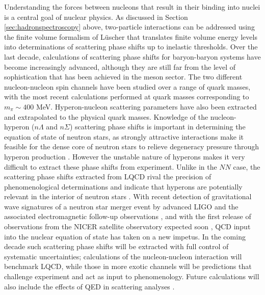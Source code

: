 Understanding the  forces between nucleons that result in their binding into nuclei is a central goal of nuclear physics. As discussed in Section \ref{sec:hadronspectroscopy} above, two-particle interactions can be addressed using the finite volume formalism of L\"uscher \cite{Luscher:1986pf,Luscher:1990ck} that translates finite volume energy levels into determinations of scattering phase shifts up to inelastic thresholds. Over the last decade, calculations of scattering phase shifts for baryon-baryon systems have become increasingly advanced, although they are still far from the level of sophistication that has been achieved in the meson sector. The two different nucleon-nucleon spin channels have been studied over a range of quark masses, with the most recent calculations  performed at quark masses corresponding to $m_\pi\sim 400$ MeV. Hyperon-nucleon scattering parameters have also been extracted and extrapolated to the physical quark masses.  
Knowledge of the nucleon-hyperon ($n\Lambda$ and $n\Sigma$) scattering phase shifts is  important in determining the equation of state of neutron stars, as strongly attractive interactions make it feasible for the dense core of neutron stars to relieve degeneracy pressure through hyperon production \cite{Lattimer:2000nx}. However the unstable nature of hyperons makes it very difficult to extract these phase shifts from experiment. Unlike in the $NN$ case, the scattering phase shifts extracted from LQCD rival the precision of phenomenological determinations and indicate that hyperons are potentially relevant in the interior of neutron stars \cite{Beane:2012ey,Wagman:2017tmp}. With recent detection of gravitational wave signatures of a  neutron star merger event by advanced LIGO and the associated electromagnetic follow-up observations \cite{TheLIGOScientific:2017qsa,GBM:2017lvd}, and with the first release of observations from the NICER satellite observatory expected soon \cite{Ozel:2015ykl}, QCD input into the nuclear equation of state has taken on a new impetus. In the coming decade such scattering phase shifts will be extracted with full control of systematic uncertainties; calculations of the nucleon-nucleon interaction will benchmark LQCD, while those in more exotic channels will be predictions that challenge experiment and act as input to phenomenology. Future calculations will also include the effects of QED in scattering analyses \cite{Beane:2014qha}.

